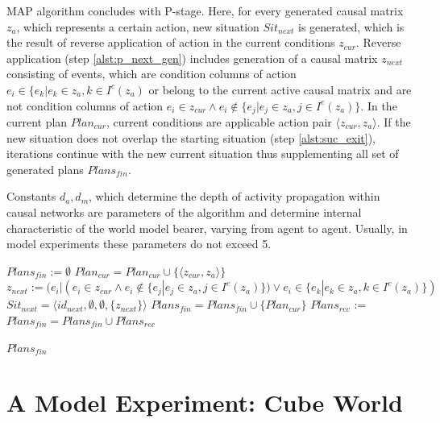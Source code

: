 \documentclass[review]{elsarticle}
\begin{document}
MAP algorithm concludes with P-stage. Here, for every generated causal matrix $z_a$, which represents a certain action, new situation $Sit_{next}$ is generated, which is the result of reverse application of action in the current conditions $z_{cur}$. Reverse application (step \ref{alst:p_next_gen}) includes generation of a causal matrix $z_{next}$ consisting of events, which are condition columns of action $e_i\in\{e_k|e_k\in z_a, k\in I^c(z_a)$ or belong to the current active causal matrix and are not condition columns of action $e_i\in z_{cur} \land e_i\not\in\{e_j|e_j\in z_a, j\in I^e(z_a)\}$. In the current plan $Plan_{cur}$, current conditions are applicable action pair $\langle z_{cur}, z_a\rangle$. If the new situation does not overlap the starting situation (step \ref{alst:suc_exit}), iterations continue with the new current situation thus supplementing all set of generated plans $Plans_{fin}$.

Constants $d_a, d_m$, which determine the depth of activity propagation within causal networks are parameters of the algorithm and determine internal characteristic of the world model bearer, varying from agent to agent. Usually, in model experiments these parameters do not exceed 5. 

\begin{algorithm}
	\begin{algorithmic}[1]
			\Statex{}
			\State $Plans_{fin} := \emptyset$
			\State $Plan_{cur} = Plan_{cur}\cup\{\langle z_{cur}, z_a\rangle\}$
			\Statex{} 		
			\State $z_{next} := (e_i|(e_i\in z_{cur} \land e_i\not\in\{e_j|e_j\in z_a, j\in I^e(z_a)\}) \lor e_i\in\{e_k|e_k\in z_a, k\in I^c(z_a)\})$\label{alst:p_next_gen}
			\State $Sit_{next} = \langle id_{next}, \emptyset, \emptyset, \{z_{next}\} \rangle$
			\label{alst:suc_exit}
			\State $Plans_{fin} = Plans_{fin}\cup\{Plan_{cur}\}$
			\Else
			\State $Plans_{rec}$ := 
			\State $Plans_{fin} = Plans_{fin}\cup Plans_{rec}$
			\EndIf
			\EndFor
			
			\State\Return $Plans_{fin}$
			\EndFunction
	\end{algorithmic}
\end{algorithm}

\section{A Model Experiment: Cube World}\label{sec:example}
\end{document}
